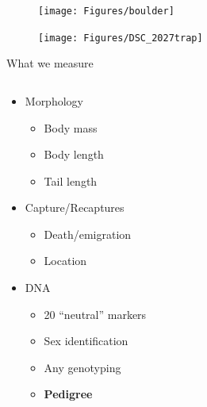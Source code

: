 \documentclass[10pt]{beamer}%
\begin{document}
\begin{frame}[plain]{}
	\begin{figure}
	\centering
		\texttt{[image: Figures/boulder]}
	\end{figure}
\end{frame}

\begin{frame}[plain]{}
	\begin{figure}
	\centering
		\texttt{[image: Figures/DSC\_2027trap]}
	\end{figure}
\end{frame}

\begin{frame}{What we measure}

\begin{columns}
	\begin{column}[c]{0.4\textwidth}
		\begin{itemize}
			\item<2-> Morphology
				\begin{itemize}
					\item Body mass 
					\item Body length
					\item Tail length
				\end{itemize}
			\item<3-> Capture/Recaptures
				\begin{itemize}
					\item Death/emigration
					\item Location
				\end{itemize}
			\item<4-> DNA
				\begin{itemize}
					\item 20 ``neutral'' markers
					\item Sex identification
					\item Any genotyping
					\item<5-> \textbf{Pedigree}
				\end{itemize}
		\end{itemize}
	\end{column}
	
	\begin{column}[c]{0.6\textwidth}


\end{column}
\end{columns}
\end{frame}
\end{document}
